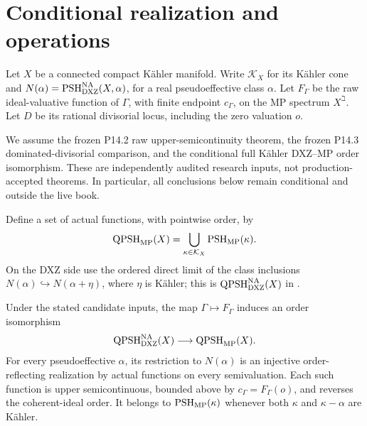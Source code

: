\section{Conditional realization and operations}

Let \(X\) be a connected compact K\"ahler manifold. Write
\(\mathcal K_X\) for its K\"ahler cone and
\(N(\alpha)=\operatorname{PSH}^{\mathrm{NA}}_{\mathrm{DXZ}}(X,\alpha)\), for a real
pseudoeffective class \(\alpha\). Let \(F_\Gamma\) be the raw
ideal-valuative function of \(\Gamma\), with finite endpoint
\(c_\Gamma\), on the MP spectrum \(X^\beth\). Let \(D\) be its
rational divisorial locus, including the zero valuation \(o\).

We assume the frozen P14.2 raw upper-semicontinuity theorem, the frozen
P14.3 dominated-divisorial comparison, and the conditional full K\"ahler
DXZ--MP order isomorphism. These are independently audited research inputs,
not production-accepted theorems. In particular, all conclusions below
remain conditional and outside the live book.

Define a set of actual functions, with pointwise order, by
\begin{equation}\label{eq:p14op-mp-qpsh}
 \operatorname{QPSH}_{\mathrm{MP}}(X)
   =\bigcup_{\kappa\in\mathcal K_X}\operatorname{PSH}_{\mathrm{MP}}(\kappa).
\end{equation}
On the DXZ side use the ordered direct limit of the class inclusions
\(N(\alpha)\hookrightarrow N(\alpha+\eta)\), where \(\eta\) is
K\"ahler; this is \(\operatorname{QPSH}^{\mathrm{NA}}_{\mathrm{DXZ}}(X)\) in
\cite[Definition~3.5 and (3.5)]{Xia23}.

\begin{theorem}\label{thm:p14op-global-realization}
Under the stated candidate inputs, the map \(\Gamma\mapsto F_\Gamma\)
induces an order isomorphism
\[
 \operatorname{QPSH}^{\mathrm{NA}}_{\mathrm{DXZ}}(X)
       \longrightarrow\operatorname{QPSH}_{\mathrm{MP}}(X).
\]
For every pseudoeffective \(\alpha\), its restriction to \(N(\alpha)\)
is an injective order-reflecting realization by actual functions on every
semivaluation. Each such function is upper semicontinuous, bounded above
by \(c_\Gamma=F_\Gamma(o)\), and reverses the coherent-ideal order.
It belongs to \(\operatorname{PSH}_{\mathrm{MP}}(\kappa)\) whenever both
\(\kappa\) and \(\kappa-\alpha\) are K\"ahler.
\end{theorem}

